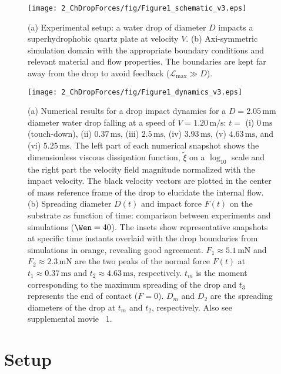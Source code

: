 \begin{figure}
	\centering
	\texttt{[image: 2\_ChDropForces/fig/Figure1\_schematic\_v3.eps]}
	\caption{(a) Experimental setup: a water drop of diameter $D$ impacts a superhydrophobic quartz plate at velocity $V$. (b) Axi-symmetric simulation domain with the appropriate boundary conditions and relevant material and flow properties. The boundaries are kept far away from the drop to avoid feedback ($\mathcal{L}_\text{max} \gg D$).}
	\label{Ch2:Fig1Schematic}
\end{figure}

\begin{sidewaysfigure}
	\centering
	\texttt{[image: 2\_ChDropForces/fig/Figure1\_dynamics\_v3.eps]}
	\caption{(a) Numerical results for a drop impact dynamics for a $D = 2.05\,\si{\milli\meter}$ diameter water drop falling at a speed of $V = 1.20\,\si{\meter}/\si{\second}$: $t =$ (i) $0\,\si{\milli\second}$ (touch-down), (ii) $0.37\,\si{\milli\second}$, (iii) $2.5\,\si{\milli\second}$, (iv) $3.93\,\si{\milli\second}$, (v) $4.63\,\si{\milli\second}$, and (vi) $5.25\,\si{\milli\second}$. The left part of each numerical snapshot shows the dimensionless viscous dissipation function, $\tilde{\xi}$ on a $\log_{10}$ scale and the right part the velocity field magnitude normalized with the impact velocity. The black velocity vectors are plotted in the center of mass reference frame of the drop to elucidate the internal flow. (b)  Spreading diameter $D(t)$ and impact force $F(t)$ on the substrate as function of time: comparison between experiments  and simulations ($\Wen = 40$). The insets show representative snapshots at specific time instants overlaid with the drop boundaries from simulations in orange, revealing good agreement. $F_1 \approx 5.1\,\si{\milli\newton}$ and  $F_2 \approx 2.3\,\si{\milli\newton}$ are the two peaks of the normal  force $F(t)$ at $t_1 \approx 0.37\,\si{\milli\second}$ and $t_2 \approx 4.63\,\si{\milli\second}$, respectively. $t_m$ is the moment corresponding to the maximum spreading of the drop and $t_3$ represents the end of contact ($F = 0$). $D_m$ and $D_2$ are the spreading diameters of the drop at $t_m$ and $t_2$, respectively. Also see supplemental movie~{\color{Myfig} 1}.}
	\label{Ch2:Fig1Dynamics}
\end{sidewaysfigure}

\section{Setup}\label{Ch2:SecSetup}

